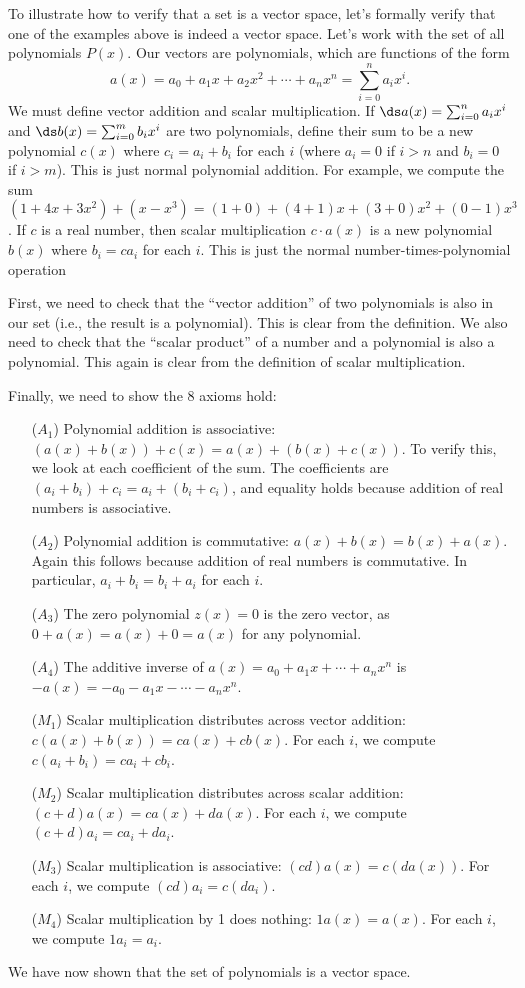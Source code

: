 \begin{example} 
To illustrate how to verify that a set is a vector space, let's formally verify that one of the examples above is indeed a vector space. Let's work with the set of all polynomials $P(x)$. Our vectors are polynomials, which are functions of the form
$$a(x) = a_0 +a_1 x+a_2 x^2 + \cdots + a_n x^n = \sum_{i=0}^n a_i x^i.$$
We must define vector addition and scalar multiplication.  
If $\ds a(x) =  \sum_{i=0}^n a_i x^i$ and $\ds b(x) =  \sum_{i=0}^m b_i x^i$ are two polynomials, define their sum to be a new polynomial $c(x)$ where $c_i = a_i+b_i$ for each $i$ (where $a_i=0$ if $i> n$ and $b_i=0$ if $i> m$). This is just normal polynomial addition.
For example, we compute the sum $(1+4x+3x^2)+(x-x^3) = (1+0)+(4+1)x+(3+0)x^2+(0-1)x^3$. If $c$ is a real number, then scalar multiplication $c\cdot a(x)$ is a new polynomial $b(x)$ where $b_i=ca_i$ for each $i$.  This is just the normal number-times-polynomial operation

First, we need to check that the ``vector addition'' of two polynomials is also in our set (i.e., the result is a polynomial).  This is clear from the definition.  We also need to check that the ``scalar product'' of a number and a polynomial is also a polynomial.  This again is clear from the definition of scalar multiplication.

Finally, we need to show the 8 axioms hold:
\begin{enumerate}
	\item[($A_1$)] Polynomial addition is associative: $(a(x)+b(x))+c(x) = a(x) +(b(x)+c(x))$. To verify this, we look at each coefficient of the sum.  The coefficients are $(a_i+b_i)+c_i = a_i+(b_i+c_i)$, and equality holds because addition of real numbers is associative.
	\item[($A_2$)] Polynomial addition is commutative: $a(x)+b(x)=b(x)+a(x)$. Again this follows because addition of real numbers is commutative. In particular, $a_i+b_i=b_i+a_i$ for each $i$.
	\item[($A_3$)] The zero polynomial $z(x)=0$ is the zero vector, as $0+a(x) = a(x)+0=a(x)$ for any polynomial.
	\item[($A_4$)] The additive inverse of $a(x) = a_0+a_1x+\cdots+a_nx^n$ is $-a(x) = -a_0-a_1x-\cdots-a_nx^n$.
	\item[($M_1$)] Scalar multiplication distributes across vector addition: $c(a(x)+b(x))= ca(x) + cb(x)$. For each $i$, we compute $c(a_i+b_i) = ca_i+cb_i$. 
	\item[($M_2$)] Scalar multiplication distributes across scalar addition: $(c+d)a(x)= ca(x)+ da(x)$. For each $i$, we compute $(c+d)a_i = ca_i+da_i$. 
	\item[($M_3$)] Scalar multiplication is associative: $(cd)a(x) = c(da(x))$. For each $i$, we compute $(cd)a_i = c(da_i)$.
	\item[($M_4$)] Scalar multiplication by 1 does nothing: $1a(x)=a(x)$. For each $i$, we compute $1a_i = a_i$.
\end{enumerate}
We have now shown that the set of polynomials is a vector space.
\end{example}




